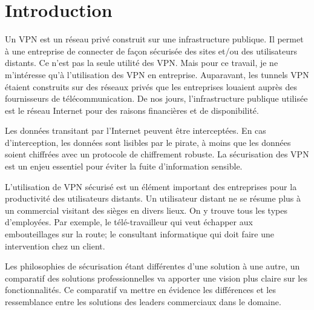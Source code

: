 \chapter*{Introduction}
Un VPN est un réseau privé construit sur une infrastructure publique. 
Il permet à une entreprise de connecter de façon sécurisée des sites et/ou des utilisateurs distants.
Ce n'est pas la seule utilité des VPN. 
Mais pour ce travail, je ne m'intéresse qu'à l'utilisation des VPN en entreprise.
Auparavant, les tunnels VPN étaient construits sur des réseaux privés que les entreprises louaient auprès des fournisseurs de télécommunication.
De nos jours, l'infrastructure publique utilisée est le réseau Internet pour des raisons financières et de disponibilité.

Les données transitant par l'Internet peuvent être interceptées.
En cas d'interception, les données sont lisibles par le pirate, à moins que les données soient chiffrées avec un protocole de chiffrement robuste.
La sécurisation des VPN est un enjeu essentiel pour éviter la fuite d'information sensible.

L'utilisation de VPN sécurisé est un élément important des entreprises pour la productivité des utilisateurs distants. 
Un utilisateur distant ne se résume plus à un commercial visitant des sièges en divers lieux.
On y trouve tous les types d'employées. Par exemple, le télé-travailleur qui veut échapper aux embouteillages sur la route; le consultant informatique qui doit faire une intervention chez un client.

Les philosophies de sécurisation étant différentes d'une solution à une autre, un comparatif des solutions professionnelles va apporter une vision plus claire sur les fonctionnalités.
Ce comparatif va mettre en évidence les différences et les ressemblance entre les solutions des leaders commerciaux dans le domaine.
